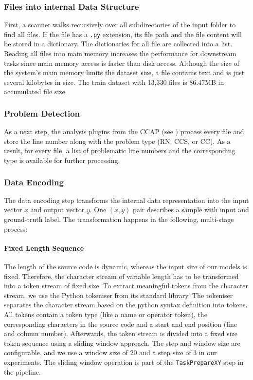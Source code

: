 \subsubsection{Files into internal Data Structure}
First, a scanner walks recursively over all subdirectories of the input folder to find all files. If the file has a \texttt{.py} extension, its file path and the file content will be stored in a dictionary. The dictionaries for all file are collected into a list. 
Reading all files into main memory increases the performance for downstream tasks since main memory access is faster than disk access. Although the size of the system's main memory limits the dataset size, a file contains text and is just several kilobytes in size. The train dataset with 13,330 files is 86.47MB in accumulated file size.

\subsubsection{Problem Detection}\label{sec:problem_detection}
As a next step, the analysis plugins from the CCAP (see ) process every file and store the line number along with the problem type (RN, CCS, or CC). As a result, for every file, a list of problematic line numbers and the corresponding type is available for further processing. 

\subsubsection{Data Encoding}\label{sec:data_encoding}
The data encoding step transforms the internal data representation into the input vector $x$ and output vector $y$. One $(x,y)$ pair describes a sample with input and ground-truth label. The transformation happens in the following, multi-stage process:
\paragraph{Fixed Length Sequence}
The length of the source code is dynamic, whereas the input size of our models is fixed. Therefore, the character stream of variable length has to be transformed into a token stream of fixed size. 
To extract meaningful tokens from the character stream, we use the Python tokeniser from its standard library. The tokeniser separates the character stream based on the python syntax definition into tokens. All tokens contain a token type (like a name or operator token), the corresponding characters in the source code and a start and end position (line and column number). Afterwards, the token stream is divided into a fixed size token sequence using a sliding window approach. The step and window size are configurable, and we use a window size of 20 and a step size of 3 in our experiments. The sliding window operation is part of the \texttt{TaskPrepareXY} step in the pipeline.

